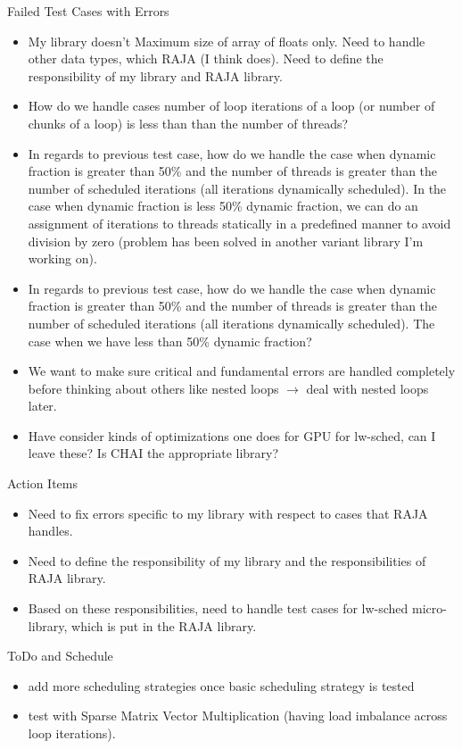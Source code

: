 \documentclass{beamer}
\begin{document}
\begin{frame}{Failed Test Cases with Errors}
\begin{itemize}
\small \item \small My library doesn't Maximum size of array of floats only. Need to handle other data types, which RAJA (I think does). Need to define the responsibility of my library and RAJA library.
\item \small How do we handle cases number of loop iterations of a loop (or number of chunks of a loop) is less than than the number of threads?
\item \small In regards to previous test case, how do we handle the case when dynamic fraction is greater than 50\% and the number of threads is greater than the number of scheduled iterations (all iterations dynamically scheduled). In the case when dynamic fraction is less 50\% dynamic fraction, we can do an assignment of iterations to threads statically in a predefined manner to avoid division by zero (problem has been solved in another variant library I'm working on).
\item \small In regards to previous test case, how do we handle the case when dynamic fraction is greater than 50\% and the number of threads is greater than the number of scheduled iterations (all iterations dynamically scheduled). The case when we have less than 50\% dynamic fraction?
\item \small We want to make sure critical and fundamental errors are handled completely before thinking about others like nested loops $\rightarrow$ deal with nested loops later. 
\item \small Have consider kinds of optimizations one does for GPU for lw-sched, can I leave these? Is CHAI the appropriate library?
\end{itemize}
\end{frame}


\begin{frame}{Action Items}
\begin{itemize}
\item Need to fix errors specific to my library with respect to cases that RAJA handles. 
\item Need to define the responsibility of my library and the responsibilities of RAJA library.
\item Based on these responsibilities, need to handle test cases for lw-sched micro-library, which is put in the RAJA library. 
\end{itemize}
\end{frame}


\begin{frame}{ToDo and Schedule}
\begin{itemize}

\item add more scheduling strategies once basic scheduling strategy is tested
\item test with Sparse Matrix Vector Multiplication (having load imbalance across loop iterations).
\end{itemize}
\end{frame}
\end{document}
